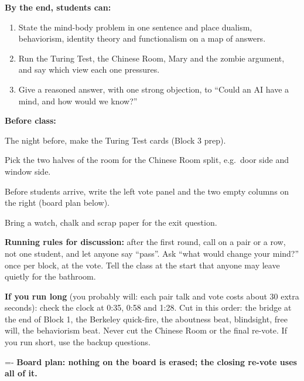 \documentclass[11pt,letterpaper]{article}
\makeatletter
\newcommand{\keep}[1]{\par\penalty\z@\begingroup\dimen@=#1\relax\dimen@ii=\pagegoal\advance\dimen@ii-\pagetotal
  \ifdim\dimen@>\dimen@ii\ifdim\dimen@ii>\z@\vfil\break\fi\fi\endgroup}
\makeatother
\begin{document}
\begin{minipage}[t]{0.48\linewidth}
\textsf{\bfseries By the end, students can:}
\begin{enumerate}
\item State the mind-body problem in one sentence and place dualism, behaviorism, identity theory and functionalism on a map of answers.
\item Run the Turing Test, the Chinese Room, Mary and the zombie argument, and say which view each one pressures.
\item Give a reasoned answer, with one strong objection, to ``Could an AI have a mind, and how would we know?''
\end{enumerate}
\end{minipage}\hfill
\begin{minipage}[t]{0.48\linewidth}
\textsf{\bfseries Before class:}
\begin{checks}
\item The night before, make the Turing Test cards (Block 3 prep).
\item Pick the two halves of the room for the Chinese Room split, e.g.\ door side and window side.
\item Before students arrive, write the left vote panel and the two empty columns on the right (board plan below).
\item Bring a watch, chalk and scrap paper for the exit question.
\end{checks}
\end{minipage}

\textsf{\bfseries Running rules for discussion:} after the first round, call on a pair or a row, not one student, and let anyone say ``pass''. Ask ``what would change your mind?'' once per block, at the vote. Tell the class at the start that anyone may leave quietly for the bathroom.

\textsf{\bfseries If you run long} (you probably will: each pair talk and vote costs about 30 extra seconds): check the clock at 0:35, 0:58 and 1:28. Cut in this order: the bridge at the end of Block 1, the Berkeley quick-fire, the aboutness beat, blindsight, free will, the behaviorism beat. Never cut the Chinese Room or the final re-vote. If you run short, use the backup questions.

\keep{22\baselineskip}
\textsf{\bfseries Board plan: nothing on the board is erased; the closing re-vote uses all of it.}
\end{document}
